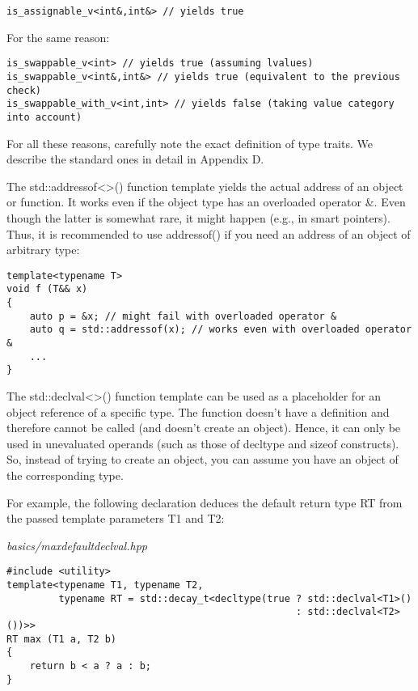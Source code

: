 \begin{lstlisting}[style=styleCXX]
is_assignable_v<int&,int&> // yields true
\end{lstlisting}

For the same reason:

\begin{lstlisting}[style=styleCXX]
is_swappable_v<int> // yields true (assuming lvalues)
is_swappable_v<int&,int&> // yields true (equivalent to the previous check)
is_swappable_with_v<int,int> // yields false (taking value category into account)
\end{lstlisting}

For all these reasons, carefully note the exact definition of type traits. We describe the standard ones in detail in Appendix D.


The std::addressof<>() function template yields the actual address of an object or function. It works even if the object type has an overloaded operator \&. Even though the latter is somewhat rare, it might happen (e.g., in smart pointers). Thus, it is recommended to use addressof() if you need an address of an object of arbitrary type:

\begin{lstlisting}[style=styleCXX]
template<typename T>
void f (T&& x)
{
	auto p = &x; // might fail with overloaded operator &
	auto q = std::addressof(x); // works even with overloaded operator &
	...
}
\end{lstlisting}


The std::declval<>() function template can be used as a placeholder for an object reference of a specific type. The function doesn’t have a definition and therefore cannot be called (and doesn’t create an object). Hence, it can only be used in unevaluated operands (such as those of decltype and sizeof constructs). So, instead of trying to create an object, you can assume you have an object of the corresponding type.

For example, the following declaration deduces the default return type RT from the passed template parameters T1 and T2:

\noindent
\textit{basics/maxdefaultdeclval.hpp}
\begin{lstlisting}[style=styleCXX]
#include <utility>
template<typename T1, typename T2,
		 typename RT = std::decay_t<decltype(true ? std::declval<T1>()
												  : std::declval<T2>())>>
RT max (T1 a, T2 b)
{
	return b < a ? a : b;
}
\end{lstlisting}


